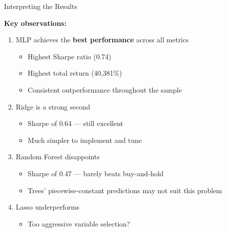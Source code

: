 \documentclass[10pt]{beamer}
\newcommand{\highlight}[1]{\textcolor{AccentOrange}{\textbf{#1}}}
\begin{document}
\begin{frame}{Interpreting the Results}

  \textbf{Key observations:}
  \begin{enumerate}
    \item MLP achieves the \highlight{best performance} across all metrics
    \begin{itemize}
      \item Highest Sharpe ratio (0.74)
      \item Highest total return (40,381\%)
      \item Consistent outperformance throughout the sample
    \end{itemize}

    \vspace{0.5em}
    \item Ridge is a strong second
    \begin{itemize}
      \item Sharpe of 0.64 --- still excellent
      \item Much simpler to implement and tune
    \end{itemize}

    \vspace{0.5em}
    \item Random Forest disappoints
    \begin{itemize}
      \item Sharpe of 0.47 --- barely beats buy-and-hold
      \item Trees' piecewise-constant predictions may not suit this problem
    \end{itemize}

    \vspace{0.5em}
    \item Lasso underperforms
    \begin{itemize}
      \item Too aggressive variable selection?
    \end{itemize}
  \end{enumerate}
\end{frame}

\end{document}
